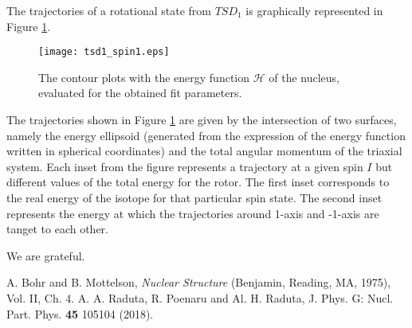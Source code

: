 \documentclass{rjparticle}
\begin{document}
The trajectories of a rotational state from $TSD_1$  is graphically represented in Figure \ref{trajectory}.

\begin{figure}[ht]
    \centering
    \texttt{[image: tsd1\_spin1.eps]}
    \caption{The contour plots with the energy function $\mathcal{H}$ of the nucleus, evaluated for the obtained fit parameters.}
    \label{trajectory}
\end{figure}

The trajectories shown in Figure \ref{trajectory} are given by the intersection of two surfaces, namely the energy ellipsoid (generated from the expression of the energy function written in spherical coordinates) and the total angular momentum of the triaxial system. Each inset from the figure represents a trajectory at a given spin $I$ but different values of the total energy for the rotor. The first inset corresponds to the real energy of the isotope for that particular spin state. The second inset represents the energy at which the trajectories around 1-axis and -1-axis are tanget to each other.

\begin{acknowledgement}
We are grateful.
\end{acknowledgement}

\begin{thebibliography}{99}

A.  Bohr and B.  Mottelson, {\it Nuclear Structure} (Benjamin, Reading, MA, 1975), Vol.  II, Ch.  4. 
A.  A.  Raduta, R.  Poenaru and Al.  H.  Raduta, J.  Phys.  G: Nucl.  Part.  Phys.  {\bf 45} 105104 (2018). 

\end{thebibliography}
\end{document}
